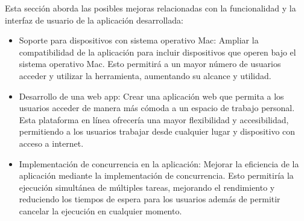 Esta sección aborda las posibles mejoras relacionadas con la funcionalidad y la interfaz de usuario de la aplicación desarrollada:

\begin{itemize}
    \item Soporte para dispositivos con sistema operativo Mac: Ampliar la compatibilidad de la aplicación para incluir dispositivos que operen bajo el sistema operativo Mac. Esto permitirá a un mayor número de usuarios acceder y utilizar la herramienta, aumentando su alcance y utilidad.
    \item Desarrollo de una web app: Crear una aplicación web que permita a los usuarios acceder de manera más cómoda a un espacio de trabajo personal. Esta plataforma en línea ofrecería una mayor flexibilidad y accesibilidad, permitiendo a los usuarios trabajar desde cualquier lugar y dispositivo con acceso a internet.
    \item Implementación de concurrencia en la aplicación: Mejorar la eficiencia de la aplicación mediante la implementación de concurrencia. Esto permitiría la ejecución simultánea de múltiples tareas, mejorando el rendimiento y reduciendo los tiempos de espera para los usuarios además de permitir cancelar la ejecución en cualquier momento.
\end{itemize}
